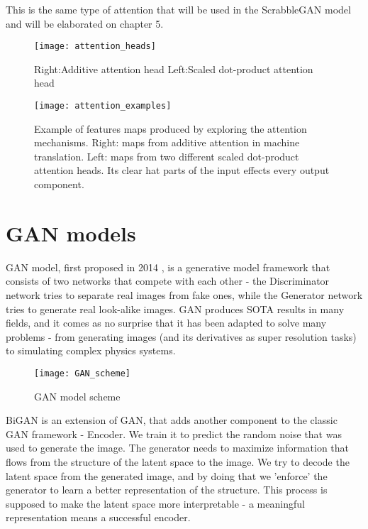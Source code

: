 This is the same type of attention that will be used in the ScrabbleGAN model and will be elaborated on chapter 5.


\begin{figure}[h]
\centering
\texttt{[image: attention\_heads]}
\caption{Right:Additive attention head Left:Scaled dot-product attention head}
\label{fig:x cubed graph}
\end{figure}


\begin{figure}[h]
\centering
\texttt{[image: attention\_examples]}
\caption{Example of features maps produced by exploring the attention mechanisms. Right: maps from additive attention in machine translation. Left: maps from two different scaled dot-product attention heads. Its clear hat parts of the input effects every output component.}
\label{fig:x cubed graph}
\end{figure}



\section{GAN models}

GAN model, first proposed in 2014 \cite{9}, is a generative model framework that consists of two networks that compete with each other - the Discriminator network tries to separate real images from fake ones, while the Generator network tries to generate real look-alike images.
GAN produces SOTA results in many fields, and it comes as no surprise that it has been adapted to solve many problems - from generating images (and its derivatives as super resolution tasks) to simulating complex physics systems.

\begin{figure}[h]
\centering
\texttt{[image: GAN\_scheme]}
\caption{GAN model scheme \cite{12}}
\label{fig:x cubed graph}
\end{figure}

BiGAN is an extension of GAN, that adds another component to the classic GAN framework - Encoder. We train it to predict the random noise that was used to generate the image. 
The generator needs to maximize information that flows from the structure of the latent space to the image. We try to decode the latent space from the generated image, and by doing that we 'enforce' the generator to learn a better representation of the structure.
This process is supposed to make the latent space more interpretable - a meaningful representation means a successful encoder.

